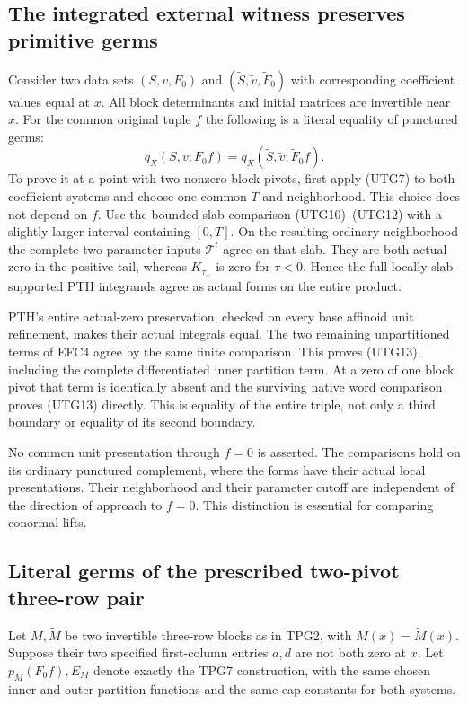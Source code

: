 \subsection{The integrated external witness preserves primitive germs}

Consider two data sets $(S,v,F_0)$ and
$(\widetilde S,\widetilde v,\widetilde F_0)$ with corresponding
coefficient values equal at $x$.  All block determinants and
initial matrices are invertible near $x$.  For the common
original tuple $f$ the following is a literal equality of
punctured germs:
\[
 q_X(S,v;F_0f)
      =q_X(\widetilde S,\widetilde v;\widetilde F_0f).
 \tag{UTG13}
\]
To prove it at a point with two nonzero block pivots, first
apply (UTG7) to both coefficient systems and choose one common
$T$ and neighborhood.  This choice does not depend on $f$.
Use the bounded-slab comparison (UTG10)--(UTG12) with a
slightly larger interval containing $[0,T]$.  On the resulting
ordinary neighborhood the complete two parameter inputs
$\mathcal T^t$ agree on that slab.  They are both actual
zero in the positive tail, whereas $K_{\tau_+}$ is zero
for $\tau<0$.  Hence the full locally slab-supported PTH
integrands agree as actual forms on the entire product.

PTH's entire actual-zero preservation, checked on every base
affinoid unit refinement, makes their actual integrals equal.
The two remaining unpartitioned terms of EFC4 agree by the
same finite comparison.  This proves (UTG13), including the
complete differentiated inner partition term.  At a zero of
one block pivot that term is identically absent and the
surviving native word comparison proves (UTG13) directly.
This is equality of the entire triple, not only a third
boundary or equality of its second boundary.

No common unit presentation through $f=0$ is asserted.  The
comparisons hold on its ordinary punctured complement, where
the forms have their actual local presentations.  Their
neighborhood and their parameter cutoff are independent of
the direction of approach to $f=0$.  This distinction is
essential for comparing conormal lifts.

\subsection{Literal germs of the prescribed two-pivot three-row pair}

Let $M,\widetilde M$ be two invertible three-row blocks as in
TPG2, with $M(x)=\widetilde M(x)$.  Suppose their two specified
first-column entries $a,d$ are not both zero at $x$.  Let
$p_M(F_0f),E_M$ denote exactly the TPG7 construction, with
the same chosen inner and outer partition functions and
the same cap constants for both systems.

